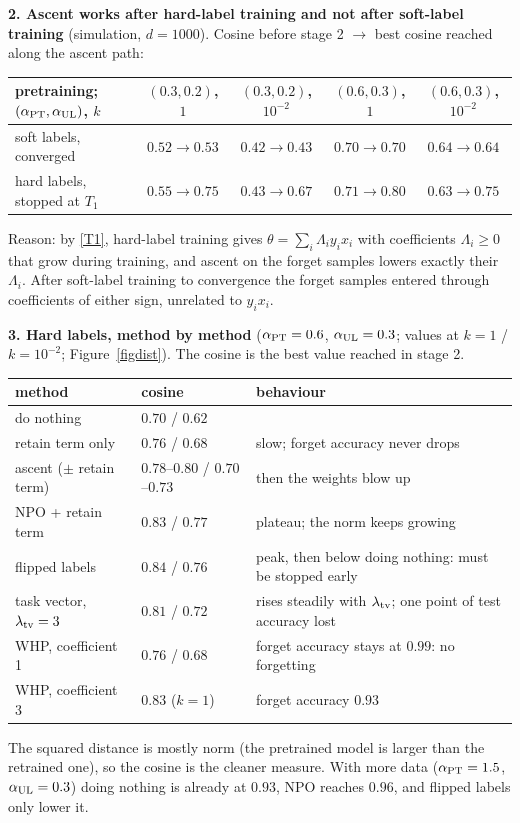 \documentclass[10pt]{article}
\begin{document}
\textbf{2. Ascent works after hard-label training and not after soft-label training} (simulation, $d=1000$). Cosine before stage 2 $\to$ best cosine reached along the ascent path:
\begin{center}\small\begin{tabular}{@{}lcccc@{}}\toprule
pretraining; $(\alpha_{\rm PT},\alpha_{\rm UL})$, $k$ & $(0.3,0.2)$, $1$ & $(0.3,0.2)$, $10^{-2}$ & $(0.6,0.3)$, $1$ & $(0.6,0.3)$, $10^{-2}$\\\midrule
soft labels, converged & $0.52\to0.53$ & $0.42\to0.43$ & $0.70\to0.70$ & $0.64\to0.64$\\
hard labels, stopped at $T_1$ & $0.55\to0.75$ & $0.43\to0.67$ & $0.71\to0.80$ & $0.63\to0.75$\\\bottomrule
\end{tabular}\end{center}
Reason: by \eqref{T1}, hard-label training gives $\theta=\sum_i\Lambda_iy_ix_i$ with coefficients $\Lambda_i\ge0$ that grow during training, and ascent on the forget samples lowers exactly their $\Lambda_i$. After soft-label training to convergence the forget samples entered through coefficients of either sign, unrelated to $y_ix_i$.

\textbf{3. Hard labels, method by method} ($\alpha_{\rm PT}=0.6$, $\alpha_{\rm UL}=0.3$; values at $k=1$ / $k=10^{-2}$; Figure~\ref{figdist}). The cosine is the best value reached in stage 2.
\begin{center}\small\begin{tabular}{@{}lll@{}}\toprule
method & cosine & behaviour\\\midrule
do nothing & $0.70$ / $0.62$ & \\
retain term only & $0.76$ / $0.68$ & slow; forget accuracy never drops\\
ascent ($\pm$ retain term) & $0.78$--$0.80$ / $0.70$--$0.73$ & then the weights blow up\\
NPO + retain term & $0.83$ / $0.77$ & plateau; the norm keeps growing\\
flipped labels & $0.84$ / $0.76$ & peak, then below doing nothing: must be stopped early\\
task vector, $\lambda_{\rm tv}=3$ & $0.81$ / $0.72$ & rises steadily with $\lambda_{\rm tv}$; one point of test accuracy lost\\
WHP, coefficient 1 & $0.76$ / $0.68$ & forget accuracy stays at $0.99$: no forgetting\\
WHP, coefficient 3 & $0.83$ ($k=1$) & forget accuracy $0.93$\\\bottomrule
\end{tabular}\end{center}
The squared distance is mostly norm (the pretrained model is larger than the retrained one), so the cosine is the cleaner measure. With more data ($\alpha_{\rm PT}=1.5$, $\alpha_{\rm UL}=0.3$) doing nothing is already at $0.93$, NPO reaches $0.96$, and flipped labels only lower it.
\end{document}
